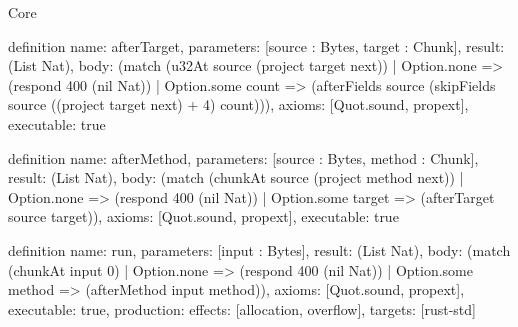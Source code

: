 \begin{lexlean}{Core}
\begin{semanticmodule}
definition{
  name: afterTarget,
  parameters: [source : Bytes, target : Chunk],
  result: (List Nat),
  body: (match (u32At source (project target next))
    | Option.none => (respond 400 (nil Nat))
    | Option.some count => (afterFields source (skipFields source ((project target next) + 4) count))),
  axioms: [Quot.sound, propext],
  executable: true
}

definition{
  name: afterMethod,
  parameters: [source : Bytes, method : Chunk],
  result: (List Nat),
  body: (match (chunkAt source (project method next))
    | Option.none => (respond 400 (nil Nat))
    | Option.some target => (afterTarget source target)),
  axioms: [Quot.sound, propext],
  executable: true
}

definition{
  name: run,
  parameters: [input : Bytes],
  result: (List Nat),
  body: (match (chunkAt input 0)
    | Option.none => (respond 400 (nil Nat))
    | Option.some method => (afterMethod input method)),
  axioms: [Quot.sound, propext],
  executable: true,
  production: {effects: [allocation, overflow], targets: [rust-std]}
}
\end{semanticmodule}
\end{lexlean}
